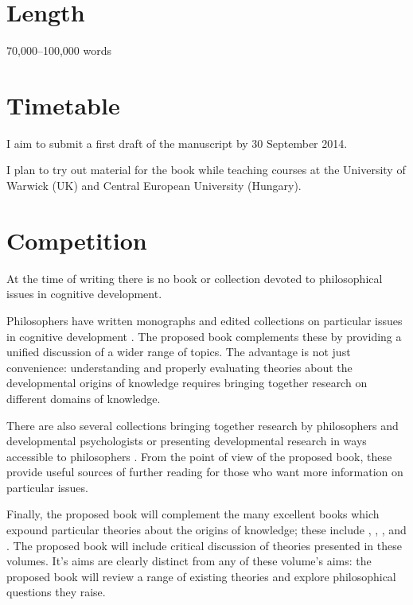 \documentclass[12pt,\papersize]{extarticle}
\begin{document}
\section{Length}
70,000--100,000 words


\section{Timetable}
I aim to submit a first draft of the manuscript by 30 September 2014.  

I plan to try out material for the book while teaching courses at the University of Warwick (UK) and Central European University (Hungary).



\section{Competition}
At the time of writing there is no book or collection devoted to philosophical issues in cognitive development.

Philosophers have written monographs and edited collections on particular issues in cognitive development \citep[e.g.][]{Bermudez:2003dj,carruthers:1996_theories}.  
The proposed book complements these by providing a unified discussion of a wider range of topics. 
The advantage is not just convenience: understanding and properly evaluating theories about the developmental origins of knowledge requires bringing together research on different domains of knowledge.

There are also several collections bringing together research by philosophers and developmental psychologists or presenting developmental research in ways accessible to philosophers 
\citep[e.g.][]{hirschfeld:1994_mapping,carruthers:2005_innate_structure,carruthers:2006_innate_culture,mccormack:2011_tool}.
From the point of view of the proposed book, these provide useful sources of further reading for those who want more information on particular issues.

Finally, the proposed book will complement the many excellent books which expound particular theories about the origins of knowledge; these include 
	\citet{carey:2009_origin},
	\citet{Tomasello:1999xz},
	\citet{Gopnik:1997xq},
	and
	\citet{Elman:1996zd}.
The proposed book will include critical discussion of theories presented in these volumes.  
It's aims are clearly distinct from any of these volume's aims: the proposed book will review a range of existing theories and explore philosophical questions they raise.  
\end{document}
